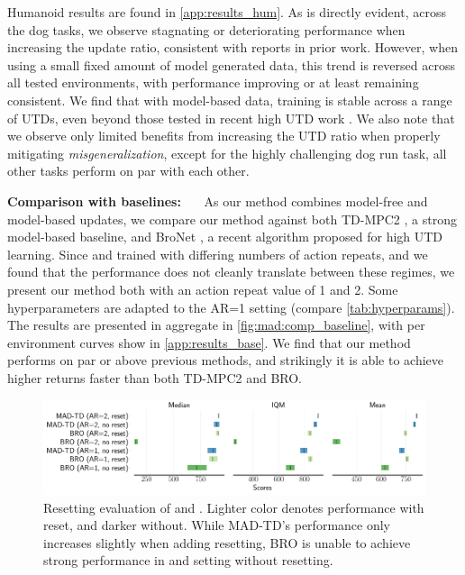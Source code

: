 Humanoid results are found in \autoref{app:results_hum}.
As is directly evident, across the dog tasks, we observe stagnating or deteriorating performance when increasing the update ratio, consistent with reports in prior work.
However, when using a small fixed amount of model generated data, this trend is reversed across all tested environments, with performance improving or at least remaining consistent.
We find that with model-based data, training is stable across a range of UTDs, even beyond those tested in recent high UTD work \parencite{nauman2024bigger}.
We also note that we observe only limited benefits from increasing the UTD ratio when properly mitigating \emph{misgeneralization}, except for the highly challenging dog run task, all other tasks perform on par with each other.

\textbf{Comparison with baselines:}~~~
As our method combines model-free and model-based updates, we compare our method against both TD-MPC2 \parencite{hansen2024tdmpc}, a strong model-based baseline, and BroNet \parencite{nauman2024bigger}, a recent algorithm proposed for high UTD learning.
Since \textcite{nauman2024bigger} and \textcite{hansen2024tdmpc} trained with differing numbers of action repeats, and we found that the performance does not cleanly translate between these regimes, we present our method both with an action repeat value of 1 and 2.
Some hyperparameters are adapted to the AR=1 setting (compare \autoref{tab:hyperparams}).
The results are presented in aggregate in \autoref{fig:mad:comp_baseline}, with per environment curves show in \autoref{app:results_base}.
We find that our method performs on par or above previous methods, and strikingly it is able to achieve higher returns faster than both TD-MPC2 and BRO.

\begin{figure}[t]
    \centering
    \includegraphics[width=1.\linewidth]{figures/mad-td/reset_rliable_comp.pdf}
    \caption{Resetting evaluation of  and . Lighter color denotes performance with reset, and darker without. While MAD-TD's performance only increases slightly when adding resetting, BRO is unable to achieve strong performance in and setting without resetting.}
    \label{fig:mad:comp_reset}
\end{figure}

